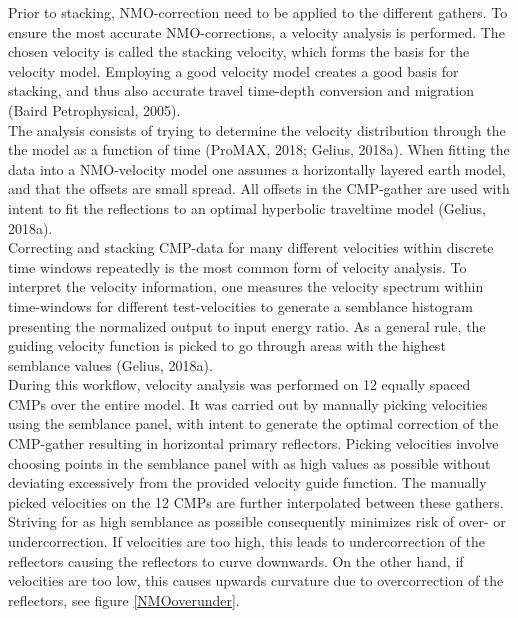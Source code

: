 \documentclass[10pt,a4paper]{article}
\begin{document}
Prior to stacking, NMO-correction need to be applied to the different gathers. To ensure the most accurate NMO-corrections, a velocity analysis is performed. The chosen velocity is called the stacking velocity, which forms the basis for the velocity model. Employing a good velocity model creates a good basis for stacking, and thus also accurate travel time-depth conversion and migration (Baird Petrophysical, 2005).
\\
The analysis consists of trying to determine the velocity distribution through the the model as a function of time (ProMAX, 2018; Gelius, 2018a). When fitting the data into a NMO-velocity model one assumes a horizontally layered earth model, and that the offsets are small spread. All offsets in the CMP-gather are used with intent to fit the reflections to an optimal hyperbolic traveltime model (Gelius, 2018a). 
\\
Correcting and stacking CMP-data for many different velocities within discrete time windows repeatedly is the most common form of velocity analysis. To interpret the velocity information, one measures the velocity spectrum within time-windows for different test-velocities to generate a semblance histogram presenting the normalized output to input energy ratio. As a general rule, the guiding velocity function is picked to go through areas with the highest semblance values (Gelius, 2018a).
\\
During this workflow, velocity analysis was performed on 12 equally spaced CMPs over the entire model. It was carried out by manually picking velocities using the semblance panel, with intent to generate the optimal correction of the CMP-gather resulting in horizontal primary reflectors. Picking velocities involve choosing points in the semblance panel with as high values as possible without deviating excessively from the provided velocity guide function. The manually picked velocities on the 12 CMPs are further interpolated between these gathers.
\\
Striving for as high semblance as possible consequently minimizes risk of over- or undercorrection. If velocities are too high, this leads to undercorrection of the reflectors causing the reflectors to curve downwards. On the other hand, if velocities are too low, this causes upwards curvature due to overcorrection of the reflectors, see figure \ref{NMOoverunder}.
\end{document}
